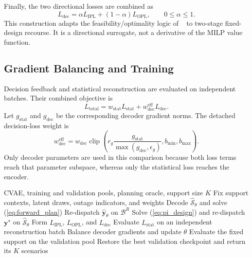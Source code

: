 \documentclass[times]{elsarticle}
\begin{document}
Finally, the two directional losses are combined as
\begin{equation}
L_{\mathrm{dec}}=\alpha L_{\mathrm{IPL}}+(1-\alpha)L_{\mathrm{OPL}},
\qquad 0\le\alpha\le1.
\label{eq:dfl_loss}
\end{equation}
This construction adapts the feasibility/optimality logic of
~\cite{Mandi2025} to two-stage fixed-design recourse. It is a directional
surrogate, not a derivative of the MILP value function.

\subsection{Gradient Balancing and Training}

Decision feedback and statistical reconstruction are evaluated on independent
batches. Their combined objective is
\begin{equation}
L_{\mathrm{total}}=w_{\mathrm{stat}}L_{\mathrm{stat}}
+w^{\mathrm{eff}}_{\mathrm{dec}}L_{\mathrm{dec}}.
\label{eq:total_loss}
\end{equation}
Let $g_{\mathrm{stat}}$ and $g_{\mathrm{dec}}$ be the corresponding decoder
gradient norms. The detached decision-loss weight is
\begin{equation}
w^{\mathrm{eff}}_{\mathrm{dec}}=w_{\mathrm{dec}}
\operatorname{clip}\left(
r_g\frac{g_{\mathrm{stat}}}{\max(g_{\mathrm{dec}},\epsilon_g)},
b_{\min},b_{\max}\right).
\label{eq:gradient_balance}
\end{equation}
Only decoder parameters are used in this comparison because both loss terms
reach that parameter subspace, whereas only the statistical loss reaches the
encoder.

\begin{algorithm}[H]
\caption{Feasibility-aware CVAE fine-tuning}
\label{alg:training}
\begin{algorithmic}[1]
\Require CVAE, training and validation pools, planning oracle, support size $K$
\State Fix support contexts, latent draws, outage indicators, and weights
  \State Decode $\widehat{\mathcal S}_\theta$ and solve (\ref{eq:forward_plan})
  \State Re-dispatch $\widehat{\bm y}_\theta$ on $\mathcal B^R$
  \State Solve (\ref{eq:pi_design}) and re-dispatch $\bm y^\star$ on
  $\widehat{\mathcal S}_\theta$
  \State Form $L_{\mathrm{IPL}}$, $L_{\mathrm{OPL}}$, and $L_{\mathrm{dec}}$
  \State Evaluate $L_{\mathrm{stat}}$ on an independent reconstruction batch
  \State Balance decoder gradients and update $\theta$
  \State Evaluate the fixed support on the validation pool
\EndFor
\State Restore the best validation checkpoint and return its $K$ scenarios
\end{algorithmic}
\end{algorithm}
\end{document}
